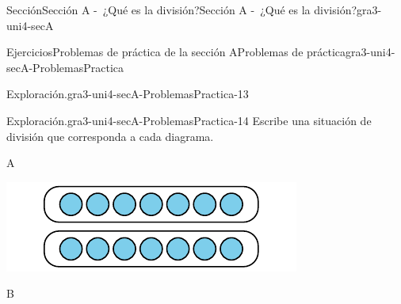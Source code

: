 \documentclass[twoside,10pt,]{article}
\begin{document}
\begin{sectionptx}{Sección}{Sección A -~¿Qué es la división?}{}{Sección A -~¿Qué es la división?}{}{}{gra3-uni4-secA}
\begin{exercises-subsection}{Ejercicios}{Problemas de práctica de la sección A}{}{Problemas de práctica}{}{}{gra3-uni4-secA-ProblemasPractica}
\begin{divisionexercise}{11}{Exploración.}{}{gra3-uni4-secA-ProblemasPractica-13}
\begin{enumerate}[label=(\alph*)]
\end{enumerate}
%
\end{divisionexercise}%
\begin{divisionexercise}{12}{Exploración.}{}{gra3-uni4-secA-ProblemasPractica-14}%
Escribe una situación de división que corresponda a cada diagrama.%
\begin{sidebyside}{6}{0.00333333333333333}{0.00333333333333333}{0.00666666666666667}%
\begin{sbspanel}{0.02}%
A%
\end{sbspanel}%
\begin{sbspanel}{0.3}%
\includegraphics[width=\linewidth]{external/svg-source/tikz-file-151674.pdf}
\end{sbspanel}%
\begin{sbspanel}{0.02}%
B%
\end{sbspanel}%
\begin{sbspanel}{0.3}%

\end{sbspanel}
\end{sidebyside}
\end{divisionexercise}
\end{exercises-subsection}
\end{sectionptx}
\end{document}
